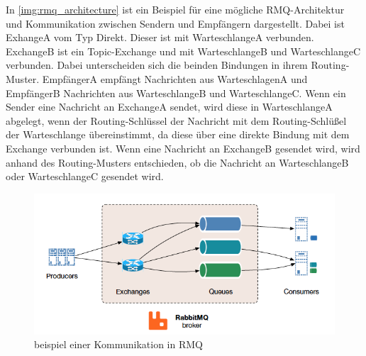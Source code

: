 In \autoref{img:rmq_architecture} ist ein Beispiel für eine mögliche RMQ-Architektur und Kommunikation zwischen Sendern und Empfängern dargestellt. Dabei ist ExhangeA vom Typ Direkt. Dieser ist mit WarteschlangeA verbunden. ExchangeB ist ein Topic-Exchange und mit WarteschlangeB und WarteschlangeC verbunden. Dabei unterscheiden sich die beinden Bindungen in ihrem Routing-Muster. EmpfängerA empfängt Nachrichten aus WarteschlagenA und EmpfängerB Nachrichten aus WarteschlangeB und WarteschlangeC. Wenn ein Sender eine Nachricht an ExchangeA sendet, wird diese in WarteschlangeA abgelegt, wenn der Routing-Schlüssel der Nachricht mit dem Routing-Schlüßel der Warteschlange übereinstimmt, da diese über eine direkte Bindung mit dem Exchange verbunden ist. Wenn eine Nachricht an ExchangeB gesendet wird, wird anhand des Routing-Musters entschieden, ob die Nachricht an WarteschlangeB oder WarteschlangeC gesendet wird. 
\begin{figure}
\center
  \includegraphics[width=1\textwidth]{images/measurement/rmqexample.png}
  \caption{beispiel einer Kommunikation in RMQ}
  \label{img:rmq_architecture}
\end{figure}

